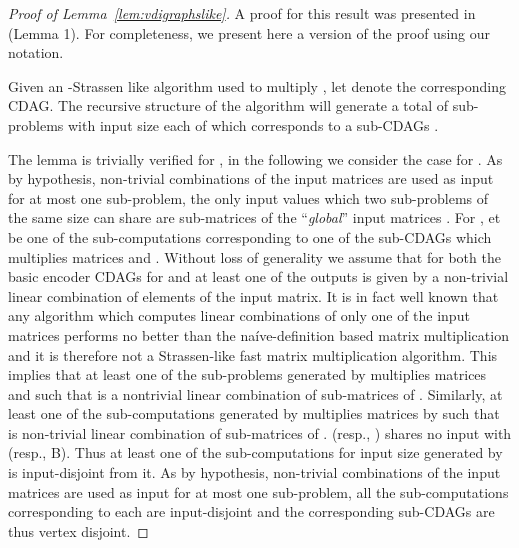 \documentclass[a4paper,UKenglish]{lipics-v2016}
\begin{document}
\begin{proof}[Proof of Lemma~\ref{lem:vdigraphslike}]
A proof for this result was presented in~\cite{scott2015matrix} (Lemma 1). For completeness, we present here a version of the proof using our notation.

Given an -Strassen like algorithm used to multiply , let  denote the corresponding CDAG. The recursive structure of the algorithm will generate a total of  sub-problems with input size  each of which corresponds to a sub-CDAGs .

The lemma is trivially verified for , in the following we consider the case for . As by hypothesis, non-trivial combinations of the input matrices are used as input for at most one sub-problem, the only input values which two sub-problems of the same size  can  share are sub-matrices of the ``\emph{global}'' input matrices . For , et  be one of the sub-computations corresponding to one of the sub-CDAGs  which multiplies matrices  and . 
Without loss of generality we assume that for both the basic encoder CDAGs for  and  at least one of the outputs is given by a non-trivial linear combination of elements of the input matrix. It is in fact well known that any algorithm which computes linear combinations of only one of the input matrices performs no better than the na\'ive-definition based matrix multiplication and it is therefore not a Strassen-like fast matrix multiplication algorithm.
This implies that at least one of the sub-problems  generated by  multiplies matrices  and  such that  is a nontrivial linear combination of sub-matrices of . Similarly, at least one of the  sub-computations  generated by  multiplies matrices  by  such that  is  non-trivial linear combination of sub-matrices of .  (resp., ) shares no input with  (resp., B). Thus at least one of the  sub-computations for input size   generated by  is input-disjoint from it. 
As by hypothesis, non-trivial combinations of the input matrices are used as input for at most one sub-problem, all the sub-computations  corresponding to each  are input-disjoint and the corresponding sub-CDAGs  are thus vertex disjoint.
\end{proof}
\end{document}
